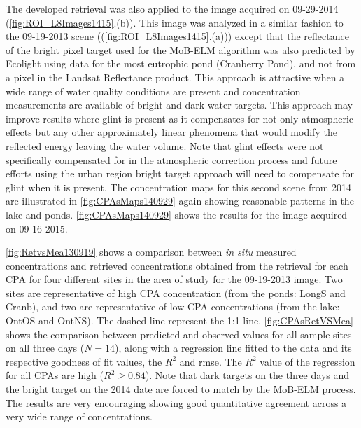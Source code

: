 The developed retrieval was also applied to the image acquired on 09-29-2014 (\autoref{fig:ROI_L8Images1415}.(b)). This image was analyzed in a similar fashion to the 09-19-2013 scene ((\autoref{fig:ROI_L8Images1415}.(a))) except that the reflectance of the bright pixel target used for the MoB-ELM algorithm was also predicted by Ecolight using data for the most eutrophic pond (Cranberry Pond), and not from a pixel in the Landsat Reflectance product. This approach is attractive when a wide range of water quality conditions are present and concentration measurements are available of bright and dark water targets. This approach may improve results where glint is present as it compensates for not only atmospheric effects but any other approximately linear phenomena that would modify the reflected energy leaving the water volume. Note that glint effects were not specifically compensated for in the atmospheric correction process and future efforts using the urban region bright target approach will need to compensate for glint when it is present. The concentration maps for this second scene from 2014 are illustrated in \autoref{fig:CPAsMaps140929} again showing reasonable patterns in the lake and ponds. \autoref{fig:CPAsMaps140929} shows the results for the image acquired on 09-16-2015.


\autoref{fig:RetvsMea130919} shows a comparison between {\it in situ} measured concentrations and retrieved concentrations obtained from the retrieval for each CPA for four different sites in the area of study for the 09-19-2013 image. Two sites are representative of high CPA concentration (from the ponds: LongS and Cranb), and two are representative of low CPA concentrations (from the lake: OntOS and OntNS). The dashed line represent the 1:1 line. \autoref{fig:CPAsRetVSMea} shows the comparison between predicted and observed values for all sample sites on all three days ($N=14$), along with a regression line fitted to the data and its respective goodness of fit values, the $R^2$ and \gls{rmse}. The $R^2$ value of the regression for all CPAs are high ($R^2\geq0.84$). Note that dark targets on the three days and the bright target on the 2014 date are forced to match by the MoB-ELM process. The results are very encouraging showing good quantitative agreement across a very wide range of concentrations. 

